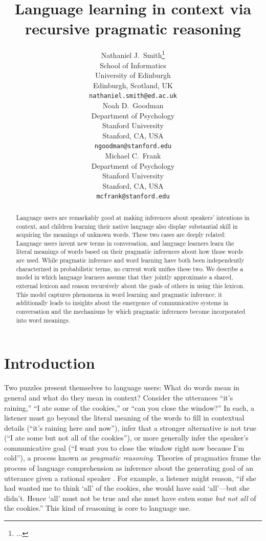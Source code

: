 \documentclass{article} %
\title{Language learning in context via recursive pragmatic reasoning}
\author{
Nathaniel J.~Smith\thanks{...} \\
School of Informatics\\
University of Edinburgh\\
Edinburgh, Scotland, UK\\
\texttt{nathaniel.smith@ed.ac.uk} \\
\AND
Noah D.~Goodman \\
Department of Psychology\\
Stanford University \\
Stanford, CA, USA \\
\texttt{ngoodman@stanford.edu} \\
\And
Michael C.~Frank \\
Department of Psychology \\
Stanford University \\
Stanford, CA, USA \\
\texttt{mcfrank@stanford.edu}}
\begin{document}
\maketitle

\begin{abstract}
  Language users are remarkably good at making inferences about
  speakers' intentions in context, and children learning their native
  language also display substantial skill in acquiring the
  meanings of unknown words. These two cases are deeply related:
  Language users invent new terms in conversation, and language
  learners learn the literal meanings of words based on their
  pragmatic inferences about how those words are used. 
 While pragmatic inference and word
  learning have both been independently characterized in probabilistic
  terms, no current work unifies these two. We describe a
  model in which language learners assume that they jointly
  approximate a shared, external lexicon and reason recursively about
  the goals of others in using this lexicon. This model captures
  phenomena in word learning and pragmatic inference; it additionally
  leads to insights about the emergence of communicative systems in
  conversation and the mechanisms by which pragmatic inferences become
  incorporated into word meanings.
\end{abstract}

\section{Introduction}

Two puzzles present themselves to language users: What do words mean in general and what do they mean in context?
Consider the utterances
``it's raining,'' ``I ate some of the cookies,'' or ``can you close
the window?'' In each, a listener must go beyond the literal meaning
of the words to fill in contextual details (``it's raining here and
now''), infer that a stronger alternative is not true (``I ate some
but not all of the cookies''), or more generally infer the speaker's
communicative goal (``I want you to close the window right now because
I'm cold''), a process known as \textit{pragmatic reasoning}. Theories of pragmatics frame
the process of language comprehension as inference about the
generating goal of an utterance given a rational speaker
\cite{grice1975,dale1995,frank2012}. For example, a listener might
reason, ``if she had wanted me to think `all' of the cookies, she
would have said `all'---but she didn't. Hence `all' must not be true
and she must have eaten some {\it but not all} of the cookies.'' This kind of reasoning is core to language use. 
\end{document}
